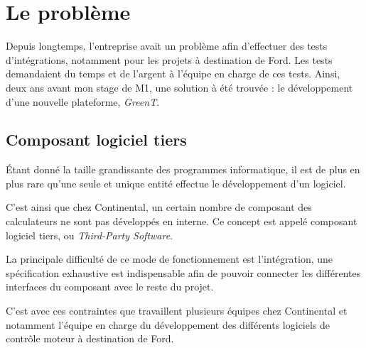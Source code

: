 \chapter{Le problème} \label{chapPb}
\putminitoc
Depuis longtemps, l'entreprise avait un problème afin d'effectuer des tests d'intégrations, notamment pour les projets à destination de Ford. Les tests demandaient du temps et de l'argent à l'équipe en charge de ces tests. Ainsi, deux ans avant mon stage de M1, une solution à été trouvée : le développement d'une nouvelle plateforme, \textit{GreenT}.
	\section{Composant logiciel tiers}
	Étant donné la taille grandissante des programmes informatique, il est de plus en plus rare qu'une seule et unique entité effectue le développement d'un logiciel.
	
	C'est ainsi que chez Continental, un certain nombre de composant des calculateurs ne sont pas développés en interne. Ce concept est appelé composant logiciel tiers, ou \textit{Third-Party Software}. 
	
	La principale difficulté de ce mode de fonctionnement est l'intégration, une spécification exhaustive est indispensable afin de pouvoir connecter les différentes interfaces du composant avec le reste du projet. 
	
	C'est avec ces contraintes que travaillent plusieurs équipes chez Continental et notamment l'équipe en charge du développement des différents logiciels de contrôle moteur à destination de Ford.
	
